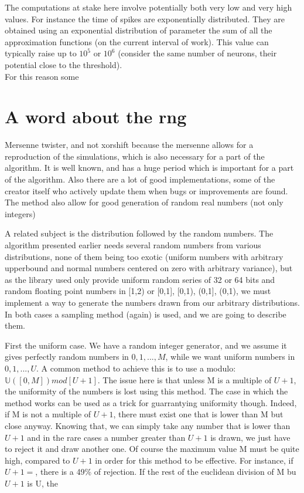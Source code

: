 	The computations at stake here involve potentially both very low and very high values. For instance the time of spikes are exponentially distributed. They are obtained using an exponential distribution of parameter the sum of all the approximation functions (on the current interval of work). This value can typically raise up to $10^5$ or $10^6$ (consider the same number of neurons, their potential close to the threshold).\\

	For this reason some 

\section{A word about the rng}
	Mersenne twister, and not xorshift because the mersenne allows for a reproduction of the simulations, which is also necessary for a part of the algorithm. It is well known, and has a huge period which is important for a part of the algorithm. Also there are a lot of good implementations, some of the creator itself who actively update them when bugs or improvements are found. The method also allow for good generation of random real numbers (not only integers)

	A related subject is the distribution followed by the random numbers. The algorithm presented earlier needs several random numbers from various distributions, none of them being too exotic (uniform numbers with arbitrary upperbound and normal numbers centered on zero with arbitrary variance), but as the library used only provide uniform random series of 32 or 64 bits and random floating point numbers in [1,2) or {[0,1], [0,1), (0,1], (0,1)}, we must implement a way to generate the numbers drawn from our arbitrary distributions. In both cases a sampling method (again) is used, and we are going to describe them.

	First the uniform case. We have a random integer generator, and we assume it gives perfectly random numbers in $ {0, 1, ..., M} $, while we want uniform numbers in $ {0, 1, ..., U} $. A common method to achieve this is to use a modulo: $ \mathbb{U}([0, M]) mod[U+1] $. The issue here is that unless M is a multiple of $ U+1 $, the uniformity of the numbers is lost using this method. The case in which the method works can be used as a trick for guarrantying uniformity though. Indeed, if M is not a multiple of $ U+1 $, there must exist one that is lower than M but close anyway. Knowing that, we can simply take any number that is lower than $ U+1 $ and in the rare cases a number greater than $ U+1 $ is drawn, we just have to reject it and draw another one. Of course the maximum value M must be quite high, compared to $ U+1 $ in order for this method to be effective. For instance, if $ U+1= $, there is a 49\% of rejection. If the rest of the euclidean division of M bu $ U+1 $ is U, the 